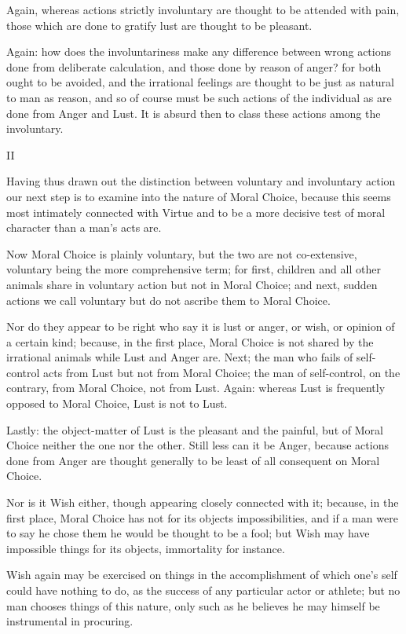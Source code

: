 Again, whereas actions strictly involuntary are thought to be attended
with pain, those which are done to gratify lust are thought to be
pleasant.

Again: how does the involuntariness make any difference between wrong
actions done from deliberate calculation, and those done by reason of
anger? for both ought to be avoided, and the irrational feelings are
thought to be just as natural to man as reason, and so of course must be
such actions of the individual as are done from Anger and Lust. It is
absurd then to class these actions among the involuntary.

II

Having thus drawn out the distinction between voluntary and involuntary
action our next step is to examine into the nature of Moral Choice,
because this seems most intimately connected with Virtue and to be a
more decisive test of moral character than a man's acts are.

Now Moral Choice is plainly voluntary, but the two are not co-extensive,
voluntary being the more comprehensive term; for first, children and all
other animals share in voluntary action but not in Moral Choice; and
next, sudden actions we call voluntary but do not ascribe them to Moral
Choice.

Nor do they appear to be right who say it is lust or anger, or wish, or
opinion of a certain kind; because, in the first place, Moral Choice is
not shared by the irrational animals while Lust and Anger are. Next; the
man who fails of self-control acts from Lust but not from Moral Choice;
the man of self-control, on the contrary, from Moral Choice, not from
Lust. Again: whereas Lust is frequently opposed to Moral Choice, Lust is
not to Lust.

Lastly: the object-matter of Lust is the pleasant and the painful, but
of Moral Choice neither the one nor the other. Still less can it be
Anger, because actions done from Anger are thought generally to be least
of all consequent on Moral Choice.

Nor is it Wish either, though appearing closely connected with it;
because, in the first place, Moral Choice has not for its objects
impossibilities, and if a man were to say he chose them he would be
thought to be a fool; but Wish may have impossible things for its
objects, immortality for instance.

Wish again may be exercised on things in the accomplishment of which
one's self could have nothing to do, as the success of any particular
actor or athlete; but no man chooses things of this nature, only such as
he believes he may himself be instrumental in procuring.

